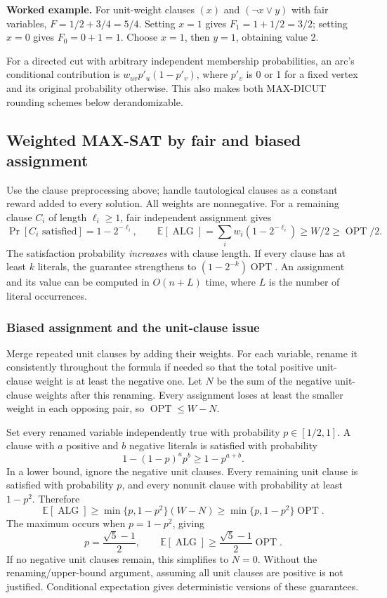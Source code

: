 \documentclass[10pt]{article}
\theoremstyle{definition}
\newcommand{\OPT}{\operatorname{OPT}}
\newcommand{\ALG}{\operatorname{ALG}}
\begin{document}
\textbf{Worked example.}
For unit-weight clauses $(x)$ and $(\neg x\lor y)$ with fair variables,
$F=1/2+3/4=5/4$. Setting $x=1$ gives $F_1=1+1/2=3/2$; setting $x=0$
gives $F_0=0+1=1$. Choose $x=1$, then $y=1$, obtaining value 2.

For a directed cut with arbitrary independent membership probabilities,
an arc's conditional contribution is $w_{uv}p'_u(1-p'_v)$, where $p'_v$ is
0 or 1 for a fixed vertex and its original probability otherwise.
This also makes both MAX-DICUT rounding schemes below derandomizable.

\subsection{Weighted MAX-SAT by fair and biased assignment}\label{ra:sat}
Use the clause preprocessing above; handle tautological clauses as a constant
reward added to every solution. All weights are nonnegative. For a remaining
clause $C_i$ of length $\ell_i\ge1$, fair independent assignment gives
\[
  \Pr[C_i\text{ satisfied}]=1-2^{-\ell_i},\qquad
  \mathbb E[\ALG]=\sum_iw_i(1-2^{-\ell_i})\ge W/2\ge\OPT/2.
\]
The satisfaction probability \emph{increases} with clause length. If every
clause has at least $k$ literals, the guarantee strengthens to
$(1-2^{-k})\OPT$. An assignment and its value can be computed in $O(n+L)$
time, where $L$ is the number of literal occurrences.

\subsubsection*{Biased assignment and the unit-clause issue}
Merge repeated unit clauses by adding their weights. For each variable,
rename it consistently throughout the formula if needed so that the total
positive unit-clause weight is at least the negative one. Let $N$ be the sum
of the negative unit-clause weights after this renaming. Every assignment
loses at least the smaller weight in each opposing pair, so
$\OPT\le W-N$.

Set every renamed variable independently true with probability
$p\in[1/2,1]$. A clause with $a$ positive and $b$ negative literals is
satisfied with probability
\[
  1-(1-p)^a p^b\ge1-p^{a+b}.
\]
In a lower bound, ignore the negative unit clauses. Every remaining unit
clause is satisfied with probability $p$, and every nonunit clause with
probability at least $1-p^2$. Therefore
\[
  \mathbb E[\ALG]\ge\min\{p,1-p^2\}(W-N)
    \ge\min\{p,1-p^2\}\OPT.
\]
The maximum occurs when $p=1-p^2$, giving
\[
  p=\frac{\sqrt5-1}{2},\qquad
  \mathbb E[\ALG]\ge\frac{\sqrt5-1}{2}\OPT.
\]
If no negative unit clauses remain, this simplifies to $N=0$.
Without the renaming/upper-bound argument, assuming all unit clauses are
positive is not justified. Conditional expectation gives deterministic
versions of these guarantees.
\end{document}
